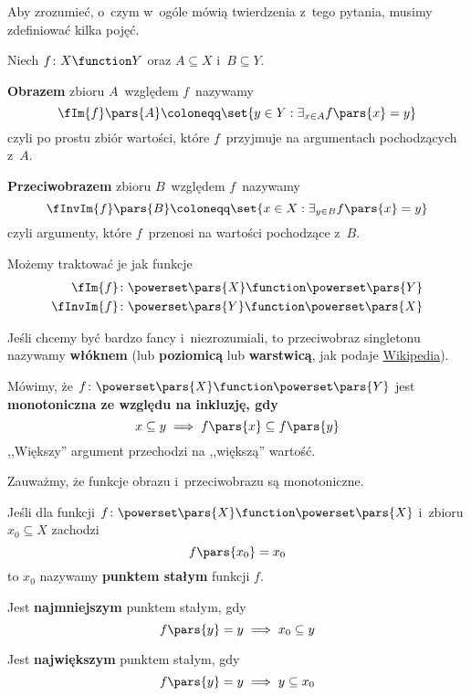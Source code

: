 Aby zrozumieć, o~czym w~ogóle mówią twierdzenia z~tego pytania, musimy zdefiniować kilka pojęć.
\begin{definition}
Niech \(f\colon X \function Y\) oraz \(A \subseteq X\) i~\(B \subseteq Y\).

\textbf{Obrazem} zbioru \(A\)~względem \(f\)~nazywamy
\begin{equation*}
    \fIm{f}\pars{A} \coloneqq \set{y \in Y : \exists_{x \in A} f\pars{x} = y}
\end{equation*}
czyli po prostu zbiór wartości, które \(f\)~przyjmuje na argumentach pochodzących z~\(A\).

\textbf{Przeciwobrazem} zbioru \(B\)~względem \(f\)~nazywamy
\begin{equation*}
    \fInvIm{f}\pars{B} \coloneqq \set{x \in X : \exists_{y \in B} f\pars{x} = y}
\end{equation*}
czyli argumenty, które \(f\)~przenosi na wartości pochodzące z~\(B\).

Możemy traktować je jak funkcje
\begin{align*}
    \fIm{f}&\colon \powerset\pars{X} \function \powerset\pars{Y}\\
    \fInvIm{f}&\colon \powerset\pars{Y} \function \powerset\pars{X}
\end{align*}

Jeśli chcemy być bardzo fancy i~niezrozumiali, to przeciwobraz singletonu nazywamy \textbf{włóknem} (lub \textbf{poziomicą} lub \textbf{warstwicą}, jak podaje \href{https://pl.wikipedia.org/wiki/Przeciwobraz}{Wikipedia}).
\end{definition}

\begin{definition}[Monotoniczność]
Mówimy, że \(f\colon \powerset\pars{X} \function \powerset\pars{Y}\) jest \textbf{monotoniczna ze względu na inkluzję, gdy}
\begin{equation*}
    x \subseteq y \implies f\pars{x} \subseteq f\pars{y}
\end{equation*}
,,Większy'' argument przechodzi na ,,większą'' wartość.
\end{definition}
Zauważmy, że funkcje obrazu i~przeciwobrazu są monotoniczne.

\begin{definition}
Jeśli dla funkcji \(f\colon \powerset\pars{X} \function \powerset\pars{X}\) i~zbioru \(x_0 \subseteq X\) zachodzi
\begin{equation*}
    f\pars{x_0} = x_0
\end{equation*}
to \(x_0\) nazywamy \textbf{punktem stałym} funkcji \(f\).

Jest \textbf{najmniejszym} punktem stałym, gdy
\begin{equation*}
    f\pars{y} = y \implies x_0 \subseteq y
\end{equation*}

Jest \textbf{największym} punktem stałym, gdy
\begin{equation*}
    f\pars{y} = y \implies y \subseteq x_0
\end{equation*}
\end{definition}
